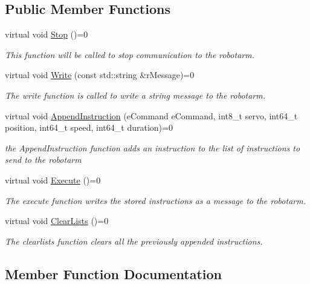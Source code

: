 \subsection*{Public Member Functions}
\begin{DoxyCompactItemize}
\item 
virtual void \hyperlink{classIExecuteCommand_a9aaabaf7284c9d295c6e2fdfc1445ca4}{Stop} ()=0
\begin{DoxyCompactList}\small\item\em This function will be called to stop communication to the robotarm. \end{DoxyCompactList}\item 
virtual void \hyperlink{classIExecuteCommand_a266571b3fc97e79be6e00b0df4c5a4ac}{Write} (const std\+::string \&r\+Message)=0
\begin{DoxyCompactList}\small\item\em The write function is called to write a string message to the robotarm. \end{DoxyCompactList}\item 
virtual void \hyperlink{classIExecuteCommand_a0f05e1cf668740504e36de8f662c0864}{Append\+Instruction} (e\+Command e\+Command, int8\+\_\+t servo, int64\+\_\+t position, int64\+\_\+t speed, int64\+\_\+t duration)=0
\begin{DoxyCompactList}\small\item\em the Append\+Instruction function adds an instruction to the list of instructions to send to the robotarm \end{DoxyCompactList}\item 
virtual void \hyperlink{classIExecuteCommand_a8180d6931ffae55f04f9984d45a9c99f}{Execute} ()=0
\begin{DoxyCompactList}\small\item\em The execute function writes the stored instructions as a message to the robotarm. \end{DoxyCompactList}\item 
virtual void \hyperlink{classIExecuteCommand_a34d2dc6186873e0f6f039fd4b41e414a}{Clear\+Lists} ()=0
\begin{DoxyCompactList}\small\item\em The clearlists function clears all the previously appended instructions. \end{DoxyCompactList}\end{DoxyCompactItemize}


\subsection{Member Function Documentation}
\mbox{\label{classIExecuteCommand_a0f05e1cf668740504e36de8f662c0864}} 
